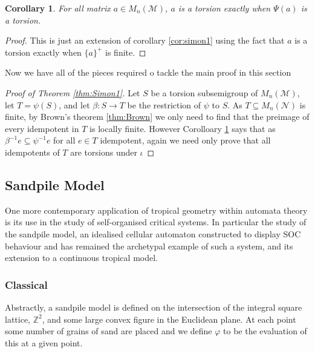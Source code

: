 \documentclass[12pt,a4paper]{amsart}
\newcommand{\Z}{\mathbb{Z}}
\newcommand{\TM}{\mathcal{M}}
\newcommand{\TN}{\mathcal{N}}
\newtheorem{cor}{Corollary}[thm]
\theoremstyle{definition}
\theoremstyle{remark}
\begin{document}
\begin{cor}\label{cor:simon2}
For all matrix $a\in M_n(\TM)$, $a$ is a torsion exactly when $\Psi(a)$ is a torsion.
\end{cor}
\begin{proof}
This is just an extension of corollary \ref{cor:simon1} using the fact that $a$ is a torsion exactly when $\{a\}^+$ is finite.
\end{proof}

Now we have all of the pieces required o tackle the main proof in this section

\begin{proof}[Proof of Theorem \ref{thm:Simon1}]
Let $S$ be a torsion subsemigroup of $M_n(\TM)$, let $T=\psi(S)$, and let $\beta:S\to T$ be the restriction of $\psi$ to $S$. As $T\subseteq M_n(\TN)$ is finite, by Brown's theorem \eqref{thm:Brown} we only need to find that the preimage of every idempotent in $T$ is locally finite. However Corolloary \ref{cor:simon2} says that as $\beta^{-1}e\subseteq\psi^{-1}e$ for all $e\in T$ idempotent, again we need only prove that all idempotents of $T$ are torsions under $\iota$
\end{proof}


\subsection{Sandpile Model}
One more contemporary application of tropical geometry within automata theory is its use in the study of self-organised critical systems\cite{bak1987self, bak1988self}. In particular the study of the sandpile model, an idealised cellular automaton constructed to display SOC behaviour and has remained the archetypal example of such a system, and its extension to a continuous tropical model\cite{kalinin2018self}.

\subsubsection{Classical}
Abstractly, a sandpile model is defined on the intersection of the integral square lattice, $\Z^2$, and some large convex figure in the Euclidean plane. At each point some number of grains of sand are placed and we define $\varphi$ to be the evaluation of this at a given point.
\end{document}
